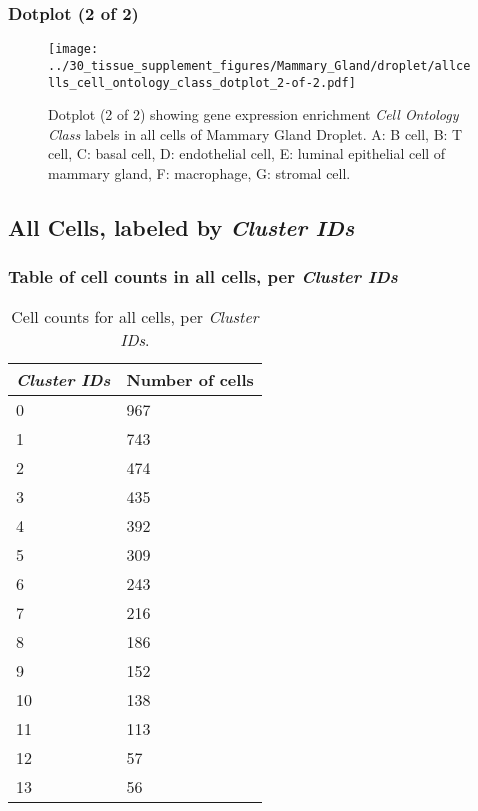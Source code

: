 \clearpage

\subsubsection{Dotplot (2 of 2)}
\begin{figure}[h]
\centering
\texttt{[image: ../30\_tissue\_supplement\_figures/Mammary\_Gland/droplet/allcells\_cell\_ontology\_class\_dotplot\_2-of-2.pdf]}

\caption{ Dotplot (2 of 2)  showing gene expression enrichment \emph{Cell Ontology Class} labels in all cells of Mammary Gland Droplet. A: B cell, B: T cell, C: basal cell, D: endothelial cell, E: luminal epithelial cell of mammary gland, F: macrophage, G: stromal cell.}
\end{figure}


\clearpage

\subsection{All Cells, labeled by \emph{Cluster IDs}}
\subsubsection{Table of cell counts in all cells, per \emph{Cluster IDs}}\begin{table}[h]
\centering
\label{my-label}
\begin{tabular}{@{}ll@{}}
\toprule

\emph{Cluster IDs}& Number of cells \\ \midrule
0 & 967 \\

1 & 743 \\

2 & 474 \\

3 & 435 \\

4 & 392 \\

5 & 309 \\

6 & 243 \\

7 & 216 \\

8 & 186 \\

9 & 152 \\

10 & 138 \\

11 & 113 \\

12 & 57 \\

13 & 56 \\
\bottomrule
\end{tabular}
\caption{Cell counts for all cells, per \emph{Cluster IDs}.}
\end{table}

